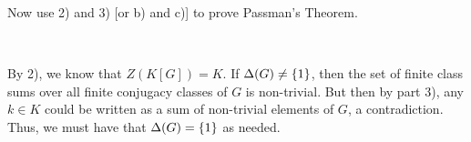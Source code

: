 \begin{exr}
	Now use 2) and 3) [or b) and c)] to prove Passman's Theorem.
\end{exr} \

\begin{pf}
	By 2), we know that $Z(K[G])=K$.
	If $\Delta(G)\neq\left\{{1}\right\}$, then the set of finite class sums over all
	finite conjugacy classes of $G$ is non-trivial.
	But then by part 3), any $k\in K$ could be written as a sum of
	non-trivial elements of $G$, a contradiction.
	Thus, we must have that $\Delta(G)=\left\{{1}\right\}$ as needed.
\end{pf}
